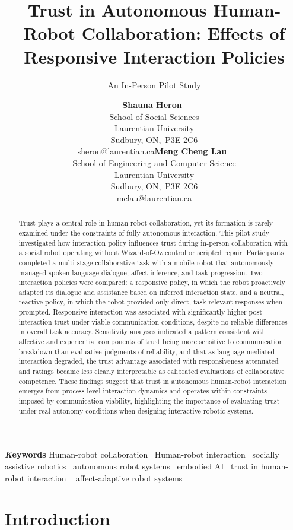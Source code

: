 \documentclass[
]{article}
\title{Trust in Autonomous Human-Robot Collaboration: Effects of
Responsive Interaction Policies}
\subtitle{An In-Person Pilot Study}
\author{\textbf{Shauna Heron}~\orcidlink{0000-0002-9262-6718}\\School of
Social Sciences\\Laurentian University\\Sudbury, ON,\ P3E
2C6\\\href{mailto:sheron@laurentian.ca}{sheron@laurentian.ca}\asep\textbf{Meng
Cheng Lau}~\orcidlink{0000-0003-3517-4900}\\School of Engineering and
Computer Science\\Laurentian University\\Sudbury, ON,\ P3E
2C6\\\href{mailto:mclau@laurentian.ca}{mclau@laurentian.ca}}
\date{}
\begin{document}
\maketitle
\begin{abstract}
Trust plays a central role in human-robot collaboration, yet its
formation is rarely examined under the constraints of fully autonomous
interaction. This pilot study investigated how interaction policy
influences trust during in-person collaboration with a social robot
operating without Wizard-of-Oz control or scripted repair. Participants
completed a multi-stage collaborative task with a mobile robot that
autonomously managed spoken-language dialogue, affect inference, and
task progression. Two interaction policies were compared: a responsive
policy, in which the robot proactively adapted its dialogue and
assistance based on inferred interaction state, and a neutral, reactive
policy, in which the robot provided only direct, task-relevant responses
when prompted. Responsive interaction was associated with significantly
higher post-interaction trust under viable communication conditions,
despite no reliable differences in overall task accuracy. Sensitivity
analyses indicated a pattern consistent with affective and experiential
components of trust being more sensitive to communication breakdown than
evaluative judgments of reliability, and that as language-mediated
interaction degraded, the trust advantage associated with responsiveness
attenuated and ratings became less clearly interpretable as calibrated
evaluations of collaborative competence. These findings suggest that
trust in autonomous human-robot interaction emerges from process-level
interaction dynamics and operates within constraints imposed by
communication viability, highlighting the importance of evaluating trust
under real autonomy conditions when designing interactive robotic
systems.
\end{abstract}
{\bfseries \emph Keywords}
\def\sep{\textbullet\ }
Human-robot collaboration \sep Human-robot interaction \sep socially
assistive robotics \sep autonomous robot systems \sep embodied
AI \sep trust in human-robot interaction \sep 
affect-adaptive robot systems



\section{Introduction}\label{introduction}
\end{document}
